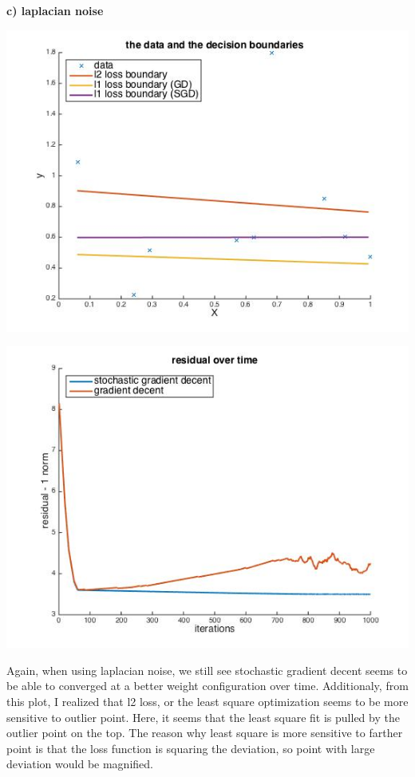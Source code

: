 \documentclass[paper=a4, fontsize=11pt]{scrartcl} %
\numberwithin{equation}{section} %
\numberwithin{figure}{section} %
\numberwithin{table}{section} %
\begin{document}
\newpage
\textbf{c) laplacian noise}
\begin{center}
\includegraphics[scale=.5]{hw7_2c_fit.jpg}
\end{center}
\begin{center}
\includegraphics[scale=.5]{hw7_2c_gdsgd.jpg}
\end{center}

Again, when using laplacian noise, we still see stochastic gradient decent seems to be able to converged at a better weight configuration over time. Additionaly, from this plot, I realized that l2 loss, or the least square optimization seems to be more sensitive to outlier point. Here, it seems that the least square  fit is pulled by the outlier point on the top. The reason why least square is more sensitive to farther point is that the loss function is squaring the deviation, so point with large deviation would be magnified. 
\end{document}
